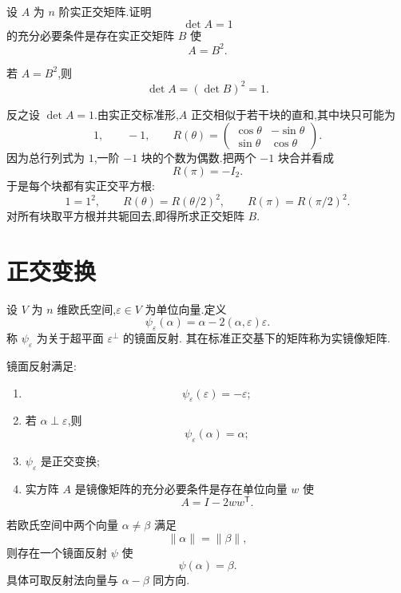 \begin{example}
设 $A$ 为 $n$ 阶实正交矩阵.证明
\[
\det A=1
\]
的充分必要条件是存在实正交矩阵 $B$ 使
\[
A=B^2.
\]
\end{example}
\exampleblank

\begin{solution}
若 $A=B^2$,则
\[
\det A=(\det B)^2=1.
\]

反之设 $\det A=1$.由实正交标准形,$A$ 正交相似于若干块的直和,其中块只可能为
\[
1,
\qquad
-1,
\qquad
R(\theta)=
\begin{pmatrix}
\cos\theta&-\sin\theta\\
\sin\theta&\cos\theta
\end{pmatrix}.
\]
因为总行列式为 $1$,一阶 $-1$ 块的个数为偶数.把两个 $-1$ 块合并看成
\[
R(\pi)=-I_2.
\]
于是每个块都有实正交平方根:
\[
1=1^2,
\qquad
R(\theta)=R(\theta/2)^2,
\qquad
R(\pi)=R(\pi/2)^2.
\]
对所有块取平方根并共轭回去,即得所求正交矩阵 $B$.
\end{solution}


\newpage

\section{正交变换}

\begin{definition}
设 $V$ 为 $n$ 维欧氏空间,$\varepsilon\in V$ 为单位向量.定义
\[
\psi_\varepsilon(\alpha)
=
\alpha-2(\alpha,\varepsilon)\varepsilon.
\]
称 $\psi_\varepsilon$ 为关于超平面 $\varepsilon^\perp$ 的镜面反射.
其在标准正交基下的矩阵称为实镜像矩阵.
\end{definition}

\begin{lemma}[\markstar]
镜面反射满足:
\begin{enumerate}
    \item
    \[
    \psi_\varepsilon(\varepsilon)=-\varepsilon;
    \]
    \item 若 $\alpha\perp\varepsilon$,则
    \[
    \psi_\varepsilon(\alpha)=\alpha;
    \]
    \item $\psi_\varepsilon$ 是正交变换;
    \item 实方阵 $A$ 是镜像矩阵的充分必要条件是存在单位向量 $w$ 使
    \[
    A=I-2ww^{\mathsf T}.
    \]
\end{enumerate}
\end{lemma}

\begin{lemma}[\marktwostar]
若欧氏空间中两个向量 $\alpha\neq\beta$ 满足
\[
\|\alpha\|=\|\beta\|,
\]
则存在一个镜面反射 $\psi$ 使
\[
\psi(\alpha)=\beta.
\]
具体可取反射法向量与 $\alpha-\beta$ 同方向.
\end{lemma}

